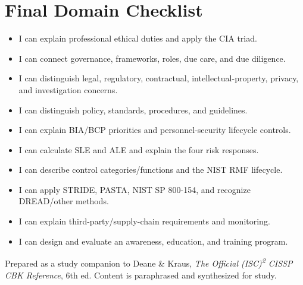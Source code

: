 \documentclass[10pt,letterpaper]{article}
\begin{document}
\section{\color{navy}Final Domain Checklist}
\begin{itemize}[label=\(\square\)]
\item I can explain professional ethical duties and apply the CIA triad.
\item I can connect governance, frameworks, roles, due care, and due diligence.
\item I can distinguish legal, regulatory, contractual, intellectual-property, privacy, and investigation concerns.
\item I can distinguish policy, standards, procedures, and guidelines.
\item I can explain BIA/BCP priorities and personnel-security lifecycle controls.
\item I can calculate SLE and ALE and explain the four risk responses.
\item I can describe control categories/functions and the NIST RMF lifecycle.
\item I can apply STRIDE, PASTA, NIST SP 800-154, and recognize DREAD/other methods.
\item I can explain third-party/supply-chain requirements and monitoring.
\item I can design and evaluate an awareness, education, and training program.
\end{itemize}

\vfill
{\footnotesize\color{teal}Prepared as a study companion to Deane \& Kraus, \textit{The Official (ISC)\textsuperscript{2} CISSP CBK Reference}, 6th ed. Content is paraphrased and synthesized for study.}
\end{document}
